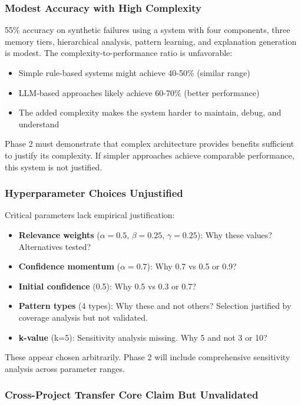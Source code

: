 \documentclass[11pt]{article}
\begin{document}
\subsubsection{Modest Accuracy with High Complexity}

55\% accuracy on synthetic failures using a system with four components, three memory tiers, hierarchical analysis, pattern learning, and explanation generation is modest. The complexity-to-performance ratio is unfavorable:

\begin{itemize}
    \item Simple rule-based systems might achieve 40-50\% (similar range)
    \item LLM-based approaches likely achieve 60-70\% (better performance)
    \item The added complexity makes the system harder to maintain, debug, and understand
\end{itemize}

Phase 2 must demonstrate that complex architecture provides benefits sufficient to justify its complexity. If simpler approaches achieve comparable performance, this system is not justified.

\subsubsection{Hyperparameter Choices Unjustified}

Critical parameters lack empirical justification:

\begin{itemize}
    \item \textbf{Relevance weights} ($\alpha=0.5$, $\beta=0.25$, $\gamma=0.25$): Why these values? Alternatives tested?
    \item \textbf{Confidence momentum} ($\alpha=0.7$): Why 0.7 vs 0.5 or 0.9?
    \item \textbf{Initial confidence} (0.5): Why 0.5 vs 0.3 or 0.7?
    \item \textbf{Pattern types} (4 types): Why these and not others? Selection justified by coverage analysis but not validated.
    \item \textbf{k-value} (k=5): Sensitivity analysis missing. Why 5 and not 3 or 10?
\end{itemize}

These appear chosen arbitrarily. Phase 2 will include comprehensive sensitivity analysis across parameter ranges.

\subsubsection{Cross-Project Transfer Core Claim But Unvalidated}
\end{document}
